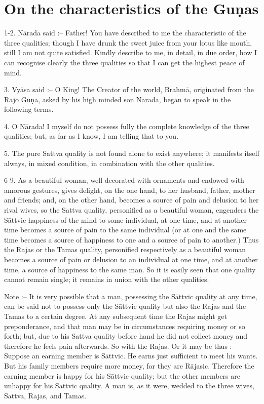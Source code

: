 \chapter{On the characteristics of the Gu\d{n}as}

1-2. N\=arada said :-- Father! You have described to me the characteristic of the three qualities; though I have drunk the sweet juice from your lotus like mouth, still I am not quite satisfied. Kindly describe to me, in detail, in due order, how I can recognise clearly the three qualities so that I can get the highest peace of mind.

3. Vy\=asa said :-- O King! The Creator of the world, Brahm\=a, originated from the Rajo Gu\d{n}a, asked by his high minded son N\=arada, began to speak in the following terms.

4. O N\=arada! I myself do not possess fully the complete knowledge of the three qualities; but, as far as I know, I am telling that to you.

5. The pure Sattva quality is not found alone to exist anywhere; it manifests itself always, in mixed condition, in combination with the other qualities.

6-9. As a beautiful woman, well decorated with ornaments and endowed with amorous gestures, gives delight, on the one hand, to her husband, father, mother and friends; and, on the other hand, becomes a source of pain and delusion to her rival wives, so the Sattva quality, personified as a beautiful woman, engenders the S\=attvic happiness of the mind to some individual, at one time, and at another time becomes a source of pain to the same individual (or at one and the same time becomes a source of happiness to one and a source of pain to another.) Thus the Rajas or the Tamas quality, personified respectively as a beautiful woman becomes a source of pain or delusion to an individual at one time, and at another time, a source of happiness to the same man. So it is easily seen that one quality cannot remain single; it remains in union with the other qualities.

Note :-- It is very possible that a man, possessing the S\=attvic quality at any time, can be said not to possess only the S\=attvic quality but also the Rajas and the Tamas to a certain degree. At any subsequent time the Rajas might get preponderance, and that man may be in circumstances requiring money or so forth; but, due to his Sattva quality before hand he did not collect money and therefore he feels pain afterwards. So with the Rajas. Or it may be thus :-- Suppose an earning member is S\=attvic. He earns just sufficient to meet his wants. But his family members require more money, for they are R\=ajasic. Therefore the earning member is happy for his S\=attvic quality; but the other members are unhappy for his S\=attvic quality. A man is, as it were, wedded to the three wives, Sattva, Rajas, and Tamas.

